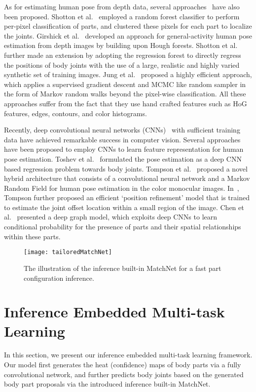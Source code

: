 \documentclass{sig-alternate-05-2015}
\begin{document}
As for estimating human pose from depth data, several approaches~\cite{rf11cvpr, hf11iccv, cr12cvpr, rf12pami, shotton13, rw15cvpr, 3d16cvpr, chu2016structure} have also been proposed. Shotton et al.~\cite{rf11cvpr} employed a random forest classifier to perform per-pixel classification of parts, and clustered these pixels for each part to localize the joints. Girshick et al.~\cite{hf11iccv} developed an approach for general-activity human pose estimation from depth images by building upon Hough forests. Shotton et al.~\cite{rf12pami} further made an extension by adopting the regression forest to directly regress the positions of body joints with the use of a large, realistic and highly varied synthetic set of training images. Jung et al.~\cite{rw15cvpr} proposed a highly efficient approach, which applies a supervised gradient descent and MCMC like random sampler in the form of Markov random walks beyond the pixel-wise classification. All these approaches suffer from the fact that they use hand crafted features such as HoG features, edges, contours, and color histograms.

Recently, deep convolutional neural networks (CNNs)~\cite{alex12nips} with sufficient training data have achieved remarkable success in computer vision. Several approaches have been proposed to employ CNNs to learn feature representation for human pose estimation. Toshev et al.~\cite{dp14cvpr} formulated the pose estimation as a deep CNN based regression problem towards body joints. Tompson et al.~\cite{jt14nips} proposed a novel hybrid architecture that consists of a convolutional neural network and a Markov Random Field for human pose estimation in the color monocular images. In~\cite{cn15cvpr}, Tompson further proposed an efficient `position refinement' model that is trained to estimate the joint offset location within a small region of the image. Chen et al.~\cite{idpr14nips} presented a deep graph model, which exploits deep CNNs to learn conditional probability for the presence of parts and their spatial relationships within these parts. 
\begin{figure*}[!htb]
\centering
\texttt{[image: tailoredMatchNet]}
\caption{The illustration of the inference built-in MatchNet for a fast part configuration inference.}\label{fig:matchnet}
\end{figure*}

\section{Inference Embedded Multi-task Learning}
\label{sec:alg}
In this section, we present our inference embedded multi-task learning framework. Our model first generates the heat (confidence) maps of body parts via a fully convolutional network, and further predicts body joints based on the generated body part proposals via the introduced inference built-in MatchNet.
\end{document}
